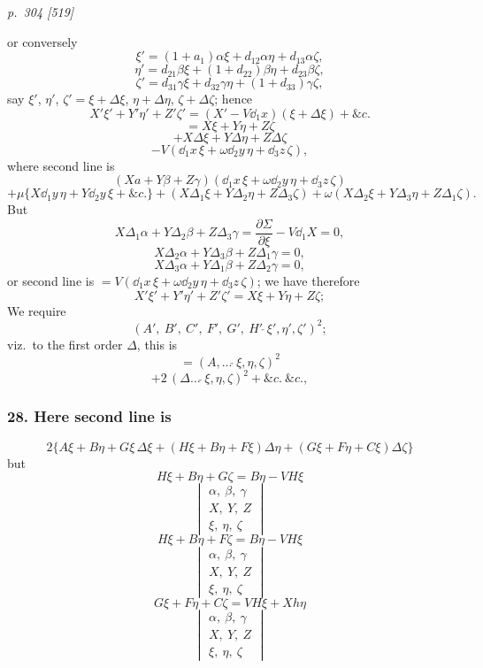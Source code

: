 \documentclass[11pt,a4paper]{book}
\begin{document}
\bigskip
\textit{p.~304 [519]}
\smallskip

\noindent
or conversely
\[
\xi' = (1 + a_1)\alpha\xi + d_{12}\alpha\eta + d_{13}\alpha\zeta,
\]
\[
\eta' = d_{21}\beta\xi + (1 + d_{22})\beta\eta + d_{23}\beta\zeta,
\]
\[
\zeta' = d_{31}\gamma\xi + d_{32}\gamma\eta + (1 + d_{33})\gamma\zeta,
\]
say $\xi'$, $\eta'$, $\zeta' = \xi + \Delta\xi$, $\eta + \Delta\eta$, $\zeta + \Delta\zeta$; hence
\[
X'\xi' + Y'\eta' + Z'\zeta' = (X' - V\dd_{1} x)(\xi + \Delta\xi) + \&c.
\]
\[
= X\xi + Y\eta + Z\zeta
\]
\[
+ X\Delta\xi + Y\Delta\eta + Z\Delta\zeta
\]
\[
- V(\dd_{1} x\,\xi + \omega\dd_{2} y\,\eta + \dd_{3} z\,\zeta),
\]
where second line is
\[
(Xa + Y\beta + Z\gamma)(\dd_{1} x\,\xi + \omega\dd_{2} y\,\eta + \dd_{3} z\,\zeta)
\]
\[
+ \mu\{X\dd_{1} y\,\eta + Y\dd_{2} y\,\xi + \&c. \} + (X\Delta_{1} \xi + Y\Delta_{2} \eta + Z\Delta_{3} \zeta) + \omega(X\Delta_{2} \xi + Y\Delta_{3} \eta + Z\Delta_{1} \zeta).
\]
But
\[
X\Delta_{1} \alpha + Y\Delta_{2} \beta + Z\Delta_{3} \gamma = \frac{\partial \Sigma}{\partial \xi} - V\dd_{1} X = 0,
\]
\[
X\Delta_{2} \alpha + Y\Delta_{3} \beta + Z\Delta_{1} \gamma = 0,
\]
\[
X\Delta_{3} \alpha + Y\Delta_{1} \beta + Z\Delta_{2} \gamma = 0,
\]
or second line is $= V(\dd_{1} x\,\xi + \omega\dd_{2} y\,\eta + \dd_{3} z\,\zeta)$; we have therefore
\[
X'\xi' + Y'\eta' + Z'\zeta' = X\xi + Y\eta + Z\zeta;
\]
We require
\[
(A',\ B',\ C',\ F',\ G',\ H'\,\check{}\,\xi',\eta',\zeta')^2;
\]
viz.\ to the first order $\Delta$, this is
\[
= (A,\ldots\,\check{}\,\xi,\eta,\zeta)^2
\]
\[
+ 2\,(\Delta\ldots\,\check{}\,\xi,\eta,\zeta)^2 +\&c.\ \&c.,
\]

\subsubsection*{28. Here second line is}
\[
2\{A\xi + B\eta + G\xi\,\Delta\xi + (H\xi + B\eta + F\xi)\Delta\eta + (G\xi + F\eta + C\xi)\Delta\zeta\}
\]
but
\[
H\xi + B\eta + G\zeta = B\eta - V H\xi
\]
\[
\begin{vmatrix}
\alpha,\ \beta,\ \gamma \\
X,\ Y,\ Z \\
\xi,\ \eta,\ \zeta
\end{vmatrix}
\]
\[
H\xi + B\eta + F\zeta = B\eta - V H\xi
\]
\[
\begin{vmatrix}
\alpha,\ \beta,\ \gamma \\
X,\ Y,\ Z \\
\xi,\ \eta,\ \zeta
\end{vmatrix}
\]
\[
G\xi + F\eta + C\zeta = V H\xi + X h\eta
\]
\[
\begin{vmatrix}
\alpha,\ \beta,\ \gamma \\
X,\ Y,\ Z \\
\xi,\ \eta,\ \zeta
\end{vmatrix}
\]
\end{document}
